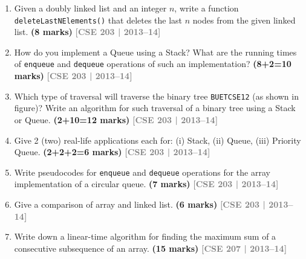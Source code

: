 \documentclass[12pt,a3paper]{article}
\newcommand{\yr}[1]{\hfill\textcolor{gray}{\small\textbf{[#1]}}}
\newcommand{\mk}[1]{\textcolor{orange!70!black}{\small\textbf{(#1 marks)}}}
\begin{document}
\begin{enumerate}
\item Given a doubly linked list and an integer $n$, write a function \texttt{deleteLastNElements()} that deletes the last $n$ nodes from the given linked list. \mk{8}
\yr{CSE 203 | 2013--14}

\item How do you implement a Queue using a Stack? What are the running times of \texttt{enqueue} and \texttt{dequeue} operations of such an implementation? \mk{8+2=10}
\yr{CSE 203 | 2013--14}

\item Which type of traversal will traverse the binary tree \texttt{BUETCSE12} (as shown in figure)? Write an algorithm for such traversal of a binary tree using a Stack or Queue. \mk{2+10=12}
\yr{CSE 203 | 2013--14}

\begin{center}
\end{center}

\item Give 2 (two) real-life applications each for: (i) Stack, (ii) Queue, (iii) Priority Queue. \mk{2+2+2=6}
\yr{CSE 203 | 2013--14}

\item Write pseudocodes for \texttt{enqueue} and \texttt{dequeue} operations for the array implementation of a circular queue. \mk{7}
\yr{CSE 203 | 2013--14}

\item Give a comparison of array and linked list. \mk{6}
\yr{CSE 203 | 2013--14}

\item Write down a linear-time algorithm for finding the maximum sum of a
consecutive subsequence of an array. \mk{15}
\yr{CSE 207 | 2013--14}


\end{enumerate}
\end{document}
